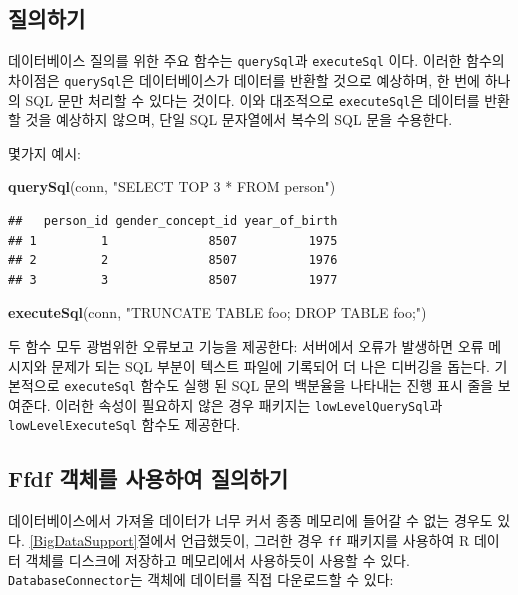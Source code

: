 \documentclass[11pt]{book}
\newenvironment{Shaded}{\begin{snugshade}}{\end{snugshade}}
\newcommand{\KeywordTok}[1]{\textcolor[rgb]{0.13,0.29,0.53}{\textbf{#1}}}
\newcommand{\StringTok}[1]{\textcolor[rgb]{0.31,0.60,0.02}{#1}}
\newcommand{\NormalTok}[1]{#1}
\theoremstyle{definition}
\theoremstyle{definition}
\theoremstyle{definition}
\theoremstyle{remark}
\begin{document}
\subsection{질의하기}

데이터베이스 질의를 위한 주요 함수는 \texttt{querySql}과
\texttt{executeSql} 이다. 이러한 함수의 차이점은 \texttt{querySql}은
데이터베이스가 데이터를 반환할 것으로 예상하며, 한 번에 하나의 SQL 문만
처리할 수 있다는 것이다. 이와 대조적으로 \texttt{executeSql}은 데이터를
반환할 것을 예상하지 않으며, 단일 SQL 문자열에서 복수의 SQL 문을
수용한다. 

몇가지 예시:

\begin{Shaded}
\begin{Highlighting}[]
\KeywordTok{querySql}\NormalTok{(conn, }\StringTok{"SELECT TOP 3 * FROM person"}\NormalTok{)}
\end{Highlighting}
\end{Shaded}

\begin{verbatim}
##   person_id gender_concept_id year_of_birth
## 1         1              8507          1975
## 2         2              8507          1976
## 3         3              8507          1977
\end{verbatim}

\begin{Shaded}
\begin{Highlighting}[]
\KeywordTok{executeSql}\NormalTok{(conn, }\StringTok{"TRUNCATE TABLE foo; DROP TABLE foo;"}\NormalTok{)}
\end{Highlighting}
\end{Shaded}

두 함수 모두 광범위한 오류보고 기능을 제공한다: 서버에서 오류가 발생하면
오류 메시지와 문제가 되는 SQL 부분이 텍스트 파일에 기록되어 더 나은
디버깅을 돕는다. 기본적으로 \texttt{executeSql} 함수도 실행 된 SQL 문의
백분율을 나타내는 진행 표시 줄을 보여준다. 이러한 속성이 필요하지 않은
경우 패키지는 \texttt{lowLevelQuerySql}과 \texttt{lowLevelExecuteSql}
함수도 제공한다.

\subsection{Ffdf 객체를 사용하여 질의하기}\label{ffdf---}

데이터베이스에서 가져올 데이터가 너무 커서 종종 메모리에 들어갈 수 없는
경우도 있다. \ref{BigDataSupport}절에서 언급했듯이, 그러한 경우
\texttt{ff} 패키지를 사용하여 R 데이터 객체를 디스크에 저장하고
메모리에서 사용하듯이 사용할 수 있다. \texttt{DatabaseConnector}는
객체에 데이터를 직접 다운로드할 수 있다:
\end{document}
